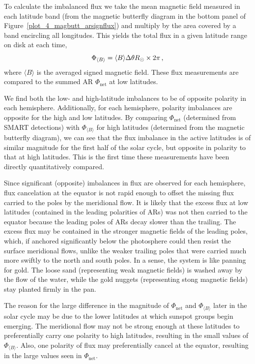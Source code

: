 To calculate the imbalanced flux we take the mean magnetic field measured in each latitude band (from the magnetic butterfly diagram in the bottom panel of Figure~\ref{plot_4_magbutt_arsignflux}) and multiply by the area covered by a band encircling all longitudes. This yields the total flux in a given latitude range on disk at each time,
\begin{equation}
\Phi_{\langle B \rangle}=\langle B \rangle \Delta \theta R_{\odot} \times 2\pi \mbox{\,,}
\end{equation}
where $\langle B \rangle$ is the averaged signed magnetic field. These flux measurements are compared to the summed \gls{AR} $\Phi_{\mathrm{net}}$ at low latitudes.

We find both the low- and high-latitude imbalances to be of opposite polarity in each hemisphere. Additionally, for each hemisphere, polarity imbalances are opposite for the high and low latitudes. By comparing $\Phi_{\mathrm{net}}$ (determined from \gls{SMART} detections) 
with $\Phi_{\langle B \rangle}$ for high latitudes (determined from the magnetic butterfly diagram), we can see that the flux imbalance in the active latitudes is of similar magnitude for the first half of the solar cycle, but opposite in polarity to that at high latitudes. This is the first time these measurements have been directly quantitatively compared. 

Since significant (opposite) imbalances in flux are observed for each hemisphere, flux cancelation at the equator is not rapid enough to offset the missing flux carried to the poles by the meridional flow. It is likely that the excess flux at low latitudes (contained in the leading polarities of \glspl{AR}) was not then carried to the equator because the leading poles of \glspl{AR} decay slower than the trailing. The excess flux may be contained in the stronger magnetic fields of the leading poles, which, if anchored significantly below the photosphere could then resist the surface meridional flows, unlike the weaker trailing poles that were carried much more swiftly to the north and south poles. In a sense, the system is like panning for gold. The loose sand (representing weak magnetic fields) is washed away by the flow of the water, while the gold nuggets (representing stong magnetic fields) stay planted firmly in the pan.

The reason for the large difference in the magnitude of $\Phi_{\mathrm{net}}$ and $\Phi_{\langle B \rangle}$ later in the solar cycle may be due to the lower latitudes at which sunspot groups begin emerging. The meridional flow may not be strong enough at these latitudes to preferentially carry one polarity to high latitudes, resulting in the small values of $\Phi_{\langle B \rangle}$. Also, one polarity of flux may preferentially cancel at the equator, resulting in the large values seen in $\Phi_{\mathrm{net}}$.


